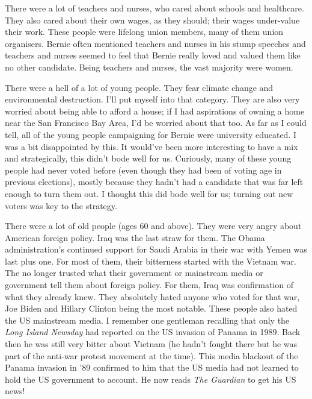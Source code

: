 \documentclass[]{book}
\begin{document}
There were a lot of teachers and nurses, who cared about schools and healthcare. They also cared about their own wages, as they should; their wages under-value their work. These people were lifelong union members, many of them union organisers. Bernie often mentioned teachers and nurses in his stump speeches and teachers and nurses seemed to feel that Bernie really loved and valued them like no other candidate. Being teachers and nurses, the vast majority were women.

There were a hell of a lot of young people. They fear climate change and environmental destruction. I'll put myself into that category. They are also very worried about being able to afford a house; if I had aspirations of owning a home near the San Francisco Bay Area, I'd be worried about that too. As far as I could tell, all of the young people campaigning for Bernie were university educated. I was a bit disappointed by this. It would've been more interesting to have a mix and strategically, this didn't bode well for us. Curiously, many of these young people had never voted before (even though they had been of voting age in previous elections), mostly because they hadn't had a candidate that was far left enough to turn them out. I thought this did bode well for us; turning out new voters was key to the strategy.

There were a lot of old people (ages 60 and above). They were very angry about American foreign policy. Iraq was the last straw for them. The Obama administration's continued support for Saudi Arabia in their war with Yemen was last plus one. For most of them, their bitterness started with the Vietnam war. The no longer trusted what their government or mainstream media or government tell them about foreign policy. For them, Iraq was confirmation of what they already knew. They absolutely hated anyone who voted for that war, Joe Biden and Hillary Clinton being the most notable. These people also hated the US mainstream media. I remember one gentleman recalling that only the \emph{Long Island Newsday} had reported on the US invasion of Panama in 1989. Back then he was still very bitter about Vietnam (he hadn't fought there but he was part of the anti-war protest movement at the time). This media blackout of the Panama invasion in '89 confirmed to him that the US media had not learned to hold the US government to account. He now reads \emph{The Guardian} to get his US news!
\end{document}
